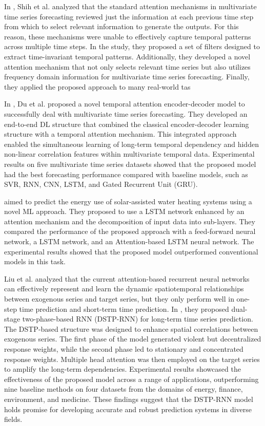 In \cite{Shih2019}, Shih et al. analyzed that the standard attention mechanisms in multivariate time series forecasting reviewed just the information at each previous time step from which to select relevant information to generate the outputs.
For this reason, these mechanisms were unable to effectively capture temporal patterns across multiple time steps.
In the study, they proposed a set of filters designed to extract time-invariant temporal patterns.
Additionally, they developed a novel attention mechanism that not only selects relevant time series but also utilizes frequency domain information for multivariate time series forecasting.
Finally, they applied the proposed approach to many real-world tas

In \cite{DU2020269}, Du et al. proposed a novel temporal attention encoder-decoder model to successfully deal with multivariate time series forecasting.
They developed an end-to-end DL structure that combined the classical encoder-decoder learning structure with a temporal attention mechanism.
This integrated approach enabled the simultaneous learning of long-term temporal dependency and hidden non-linear correlation features within multivariate temporal data.
Experimental results on five multivariate time series datasets showed that the proposed model had the best forecasting performance compared with baseline models, such as SVR, RNN, CNN, LSTM, and Gated Recurrent Unit (GRU).

\cite{HEIDARI2020626} aimed to predict the energy use of solar-assisted water heating systems using a novel ML approach.
They proposed to use a LSTM network enhanced by an attention mechanism and the decomposition of input data into sub-layers.
They compared the performance of the proposed approach with a feed-forward neural network, a LSTM network, and an Attention-based LSTM neural network.
The experimental results showed that the proposed model outperformed conventional models in this task.

Liu et al. analyzed that the current attention-based recurrent neural networks can effectively represent and learn the dynamic spatiotemporal relationships between exogenous series and target series, but they only perform well in one-step time prediction and short-term time prediction.
In \cite{LIU2020113082}, they proposed dual-stage two-phase-based RNN (DSTP-RNN) for long-term time series prediction.
The DSTP-based structure was designed to enhance spatial correlations between exogenous series.
The first phase of the model generated violent but decentralized response weights, while the second phase led to stationary and concentrated response weights.
Multiple head attention was then employed on the target series to amplify the long-term dependencies.
Experimental results showcased the effectiveness of the proposed model across a range of applications, outperforming nine baseline methods on four datasets from the domains of energy, finance, environment, and medicine.
These findings suggest that the DSTP-RNN model holds promise for developing accurate and robust prediction systems in diverse fields.

